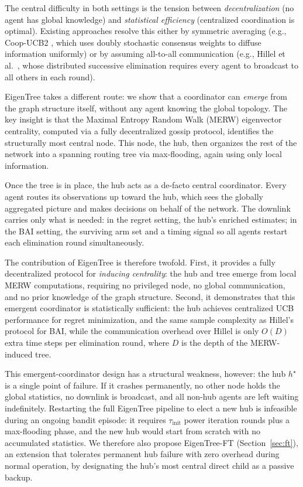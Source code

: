 \documentclass{article}
\newcommand{\merw}{EigenTree}
\newcommand{\merwft}{EigenTree-FT}
\begin{document}
The central difficulty in both settings is the tension between \emph{decentralization} (no agent has global knowledge) and \emph{statistical efficiency} (centralized coordination is optimal). Existing approaches resolve this either by symmetric averaging (e.g., Coop-UCB2 \citep{landgren2021distributed}, which uses doubly stochastic consensus weights to diffuse information uniformly) or by assuming all-to-all communication (e.g., Hillel et al.\ \citep{hillel2013distributed}, whose distributed successive elimination requires every agent to broadcast to all others in each round).

\merw{} takes a different route: we show that a coordinator can \emph{emerge} from the graph structure itself, without any agent knowing the global topology. The key insight is that the Maximal Entropy Random Walk (MERW) eigenvector centrality, computed via a fully decentralized gossip protocol, identifies the structurally most central node. This node, the hub, then organizes the rest of the network into a spanning routing tree via max-flooding, again using only local information.

Once the tree is in place, the hub acts as a de-facto central coordinator. Every agent routes its observations up toward the hub, which sees the globally aggregated picture and makes decisions on behalf of the network. The downlink carries only what is needed: in the regret setting, the hub's enriched estimates; in the BAI setting, the surviving arm set and a timing signal so all agents restart each elimination round simultaneously.

The contribution of \merw{} is therefore twofold. First, it provides a fully decentralized protocol for \emph{inducing centrality}: the hub and tree emerge from local MERW computations, requiring no privileged node, no global communication, and no prior knowledge of the graph structure. Second, it demonstrates that this emergent coordinator is statistically sufficient: the hub achieves centralized UCB performance for regret minimization, and the same sample complexity as Hillel's protocol for BAI, while the communication overhead over Hillel is only $O(D)$ extra time steps per elimination round, where $D$ is the depth of the MERW-induced tree.

This emergent-coordinator design has a structural weakness, however: the hub $h^\star$ is a single point of failure. If it crashes permanently, no other node holds the global statistics, no downlink is broadcast, and all non-hub agents are left waiting indefinitely. Restarting the full \merw{} pipeline to elect a new hub is infeasible during an ongoing bandit episode: it requires $\tau_{\mathrm{init}}$ power iteration rounds plus a max-flooding phase, and the new hub would start from scratch with no accumulated statistics. We therefore also propose \merwft{} (Section~\ref{sec:ft}), an extension that tolerates permanent hub failure with zero overhead during normal operation, by designating the hub's most central direct child as a passive backup.
\end{document}
